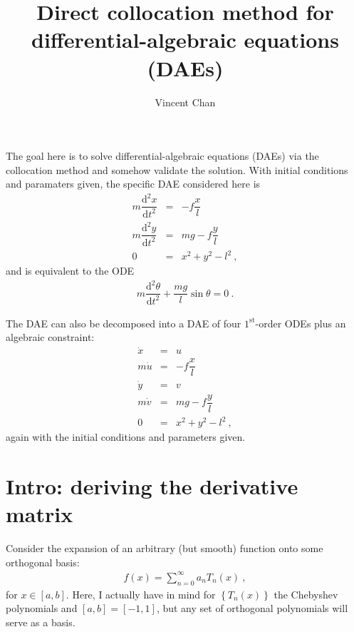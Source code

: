 \documentclass[11pt]{amsdtx}
\title{Direct collocation method for differential-algebraic equations (DAEs)}
\author{Vincent Chan}
\date{}
\newcommand{\ud}{\mathrm{d}}
\newcommand{\st}{\mathrm{st}}
\begin{document}
\maketitle

The goal here is to solve differential-algebraic equations (DAEs) via the collocation method and somehow validate the solution.  With initial conditions and paramaters given, the specific DAE considered here is
\begin{eqnarray*}
	m \dfrac{\ud^2 x}{\ud t^2} &=& -f\dfrac{x}{l} \\
	m \dfrac{\ud^2 y}{\ud t^2} &=& mg - f\dfrac{y}{l} \\
	0 &=& x^2 + y^2 - l^2 ~,
\end{eqnarray*}
and is equivalent to the ODE
\begin{eqnarray*}
	m \dfrac{\ud^2 \theta }{\ud t^2} + \dfrac{m g}{l} \sin \theta = 0~.
\end{eqnarray*}


The DAE can also be decomposed into a DAE of four $1^{\st}$-order ODEs plus an algebraic constraint:
\begin{eqnarray*}
	\dot{x} &=& u \\
	m\dot{u} &=& - f\dfrac{x}{l} \\
	\dot{y} &=& v  \\
	m \dot{v} &=& mg - f\dfrac{y}{l} \\
	0 &=& x^2 + y^2 - l^2 ~,
\end{eqnarray*}
again with the initial conditions and parameters given.

\section{Intro: deriving the derivative matrix}

Consider the expansion of an arbitrary (but smooth) function onto some orthogonal basis:
\begin{eqnarray}
	f(x) = \sum_{n = 0}^{\infty} a_n T_n(x)~,
\end{eqnarray}
for $x \in \left[ a, b \right]$.  Here, I actually have in mind for $\left\lbrace T_n(x) \right\rbrace$ the Chebyshev polynomials and $[a, b] = [-1, 1]$, but any set of orthogonal polynomials will serve as a basis.
\end{document}
